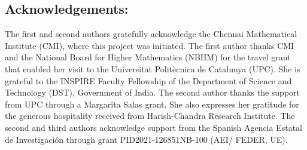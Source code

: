 \documentclass[english]{amsart}
\theoremstyle{definition}
\begin{document}


\subsection*{Acknowledgements:}

The first and second authors gratefully acknowledge the Chennai Mathematical Institute (CMI), where this project was initiated. The first author thanks CMI and the National Board for Higher Mathematics (NBHM) for the travel grant that enabled her visit to the Universitat Polit\`ecnica de Catalunya (UPC). She is grateful to the INSPIRE Faculty Fellowship of the Department of Science and Technology (DST), Government of India. The second author thanks the support from UPC through a Margarita Salas grant. She also expresses her gratitude for the generous hospitality received from Harish-Chandra Research Institute. The second and third authors acknowledge support from the Spanish Agencia Estatal de Investigaci\'on through grant PID2021-126851NB-100 (AEI/ FEDER, UE). 

\vspace{0.2cm}
\end{document}
